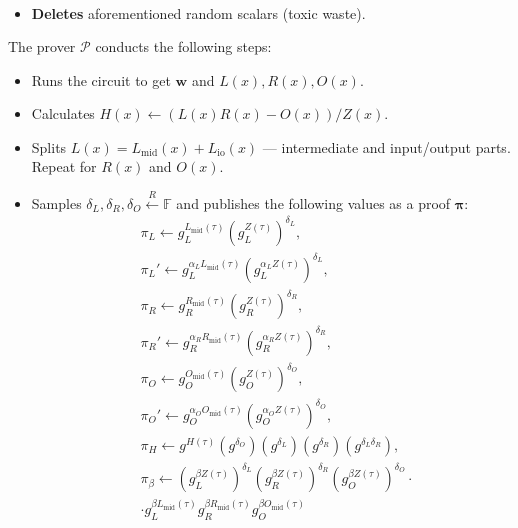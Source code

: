 \documentclass[../lecture-notes.tex]{subfiles}
\begin{document}
\begin{tcolorbox}
\begin{itemize}[label=]
\begin{equation*}
\begin{aligned}
            \end{aligned}
        \end{equation*}
        \item \textbf{Deletes} aforementioned random scalars (toxic waste).
    \end{itemize}
    The prover $\mathcal{P}$ conducts the following steps:
    \begin{itemize}[label=]
        \item Runs the circuit to get $\mathbf{w}$ and $L(x),R(x),O(x)$.
        \item Calculates $H(x) \gets (L(x)R(x) - O(x))\big/ Z(x)$.
        \item Splits $L(x) = L_{\text{mid}}(x) + L_{\text{io}}(x)$ --- intermediate and input/output parts. Repeat for $R(x)$ and $O(x)$.
        \item Samples $\delta_L, \delta_R, \delta_O \xleftarrow{R} \mathbb{F}$ and publishes the following values as a proof $\boldsymbol{\pi}$: 
        \begin{equation*}
            \begin{aligned} 
                &\pi_L \gets g_L^{L_{\text{mid}}(\tau)}\left(g_L^{Z(\tau)}\right)^{\delta_L}, \\ & \pi_L' \gets g_L^{\alpha_LL_{\text{mid}}(\tau)}\left(g_L^{\alpha_L Z(\tau)}\right)^{\delta_L}, \\
                &\pi_R \gets g_R^{R_{\text{mid}}(\tau)}\left(g_R^{Z(\tau)}\right)^{\delta_R}, \\ & \pi_R' \gets g_R^{\alpha_RR_{\text{mid}}(\tau)}\left(g_R^{\alpha_R Z(\tau)}\right)^{\delta_R}, \\
                &\pi_O \gets g_O^{O_{\text{mid}}(\tau)}\left(g_O^{Z(\tau)}\right)^{\delta_O}, \\ & \pi_O' \gets g_O^{\alpha_OO_{\text{mid}}(\tau)}\left(g_O^{\alpha_O Z(\tau)}\right)^{\delta_O}, \\
                &\pi_H \gets g^{H(\tau)}(g^{\delta_O})(g^{\delta_L})(g^{\delta_R})(g^{\delta_L\delta_R}), \\ 
                &\pi_{\beta} \gets \left(g_L^{\beta Z(\tau)}\right)^{\delta_L}\left(g_R^{\beta Z(\tau)}\right)^{\delta_R}\left(g_O^{\beta Z(\tau)}\right)^{\delta_O} \cdot \\ & \cdot g_L^{\beta L_{\text{mid}}(\tau)}g_R^{\beta R_{\text{mid}}(\tau)}g_O^{\beta O_{\text{mid}}(\tau)}
            \end{aligned}
        \end{equation*}
    \end{itemize}


\end{tcolorbox}
\end{document}
